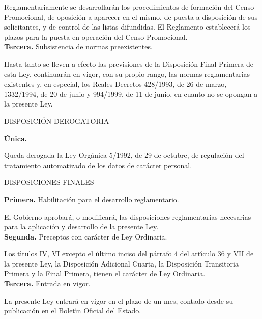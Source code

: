 Reglamentariamente se desarrollar\'an los procedimientos de formaci\'on del 
Censo Promocional, de oposici\'on a aparecer en el mismo, de puesta a 
disposici\'on de sus solicitantes, y de control de las listas difundidas. El 
Reglamento establecer\'a los plazos para la puesta en operaci\'on del Censo 
Promocional.
\vspace{0.3cm}\\
{\large {\bf Tercera.} Subsistencia de normas preexistentes.}

Hasta tanto se lleven a efecto las previsiones de la Disposici\'on Final 
Primera de esta Ley, continuar\'an en vigor, con su propio rango, las normas 
reglamentarias existentes y, en especial, los Reales Decretos 428/1993, de 26 
de marzo, 1332/1994, de 20 de junio y 994/1999, de 11 de junio, en cuanto no se 
opongan a la presente Ley.
\begin{center}
{\LARGE DISPOSICI\'ON DEROGATORIA}
\end{center}
\vspace{0.3cm} 
{\large {\bf \'Unica.}}

Queda derogada la Ley Org\'anica 5/1992, de 29 de octubre, de regulaci\'on del 
tratamiento automatizado de los datos de car\'acter personal.
\begin{center}
{\LARGE DISPOSICIONES FINALES}
\end{center}
\vspace{0.3cm}
{\large {\bf Primera.} Habilitaci\'on para el desarrollo reglamentario.}

El Gobierno aprobar\'a, o modificar\'a, las disposiciones reglamentarias 
necesarias para la aplicaci\'on y desarrollo de la presente Ley.
\vspace{0.3cm}\\
{\large {\bf Segunda.} Preceptos con car\'acter de Ley Ordinaria.}

Los t\'{\i}tulos IV, VI excepto el \'ultimo inciso del p\'arrafo 4 del 
art\'{\i}culo 36 y VII de la presente Ley, la Disposici\'on Adicional Cuarta, 
la Disposici\'on Transitoria Primera y la Final Primera, tienen el car\'acter 
de Ley Ordinaria.
\vspace{0.3cm}\\
{\large {\bf Tercera.} Entrada en vigor.}

La presente Ley entrar\'a en vigor en el plazo de un mes, contado desde su 
publicaci\'on en el Bolet\'{\i}n Oficial del Estado.
